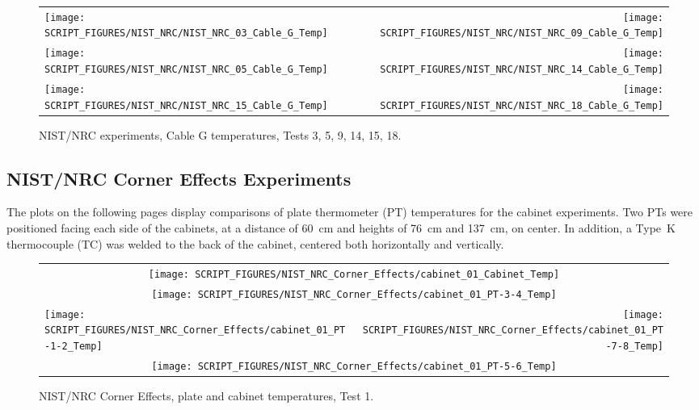\begin{figure}[p]
\begin{tabular*}{\textwidth}{l@{\extracolsep{\fill}}r}
\texttt{[image: SCRIPT\_FIGURES/NIST\_NRC/NIST\_NRC\_03\_Cable\_G\_Temp]} &
\texttt{[image: SCRIPT\_FIGURES/NIST\_NRC/NIST\_NRC\_09\_Cable\_G\_Temp]} \\
\texttt{[image: SCRIPT\_FIGURES/NIST\_NRC/NIST\_NRC\_05\_Cable\_G\_Temp]} &
\texttt{[image: SCRIPT\_FIGURES/NIST\_NRC/NIST\_NRC\_14\_Cable\_G\_Temp]} \\
\texttt{[image: SCRIPT\_FIGURES/NIST\_NRC/NIST\_NRC\_15\_Cable\_G\_Temp]} &
\texttt{[image: SCRIPT\_FIGURES/NIST\_NRC/NIST\_NRC\_18\_Cable\_G\_Temp]}
\end{tabular*}
\caption[NIST/NRC experiments, Cable G temperatures, Tests 3, 5, 9, 14, 15, 18]{NIST/NRC experiments, Cable G temperatures, Tests 3, 5, 9, 14, 15, 18.}
\label{NIST_NRC_Cable_G_Open}
\end{figure}

\clearpage

\subsection{NIST/NRC Corner Effects Experiments}

The plots on the following pages display comparisons of plate thermometer (PT) temperatures for the cabinet experiments. Two PTs were positioned facing each side of the cabinets, at a distance of 60~cm and heights of 76~cm and 137~cm, on center. In addition, a Type~K thermocouple (TC) was welded to the back of the cabinet, centered both horizontally and vertically.

\newpage

\begin{figure}[p]
\begin{tabular*}{\textwidth}{l@{\extracolsep{\fill}}r}
\multicolumn{2}{c}{\texttt{[image: SCRIPT\_FIGURES/NIST\_NRC\_Corner\_Effects/cabinet\_01\_Cabinet\_Temp]}} \\
\multicolumn{2}{c}{\texttt{[image: SCRIPT\_FIGURES/NIST\_NRC\_Corner\_Effects/cabinet\_01\_PT-3-4\_Temp]}} \\
\texttt{[image: SCRIPT\_FIGURES/NIST\_NRC\_Corner\_Effects/cabinet\_01\_PT-1-2\_Temp]} &
\texttt{[image: SCRIPT\_FIGURES/NIST\_NRC\_Corner\_Effects/cabinet\_01\_PT-7-8\_Temp]} \\
\multicolumn{2}{c}{\texttt{[image: SCRIPT\_FIGURES/NIST\_NRC\_Corner\_Effects/cabinet\_01\_PT-5-6\_Temp]}}
\end{tabular*}
\caption[NIST/NRC Corner Effects, plate and cabinet temperatures, Test 1]{NIST/NRC Corner Effects, plate and cabinet temperatures, Test 1.}
\label{NIST_NRC_Cabinet_PT_Test_1}
\end{figure}

